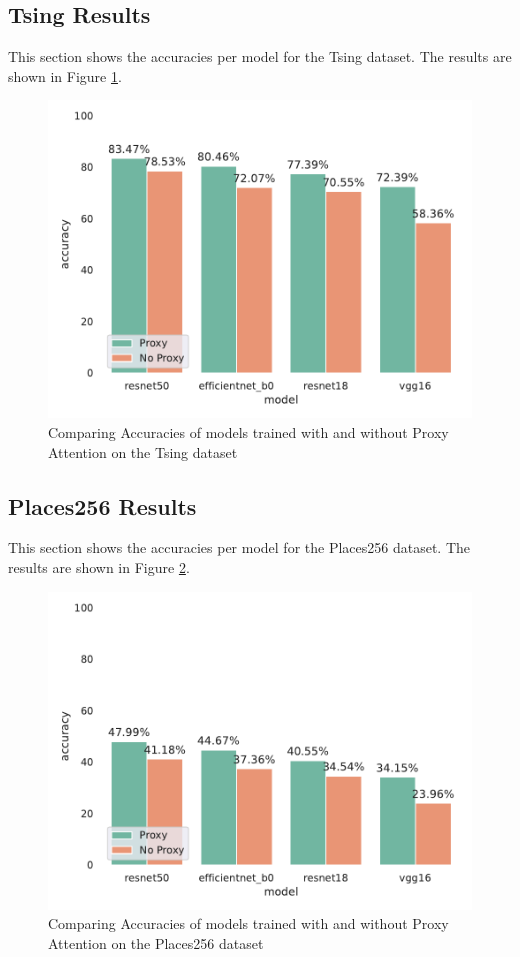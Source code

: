 \subsection{Tsing Results}
This section shows the accuracies per model for the Tsing dataset. The results are shown in Figure \ref{fig:tsing_results}. 
\begin{figure}[H]
    \centering
    \includegraphics[width=1\textwidth]{results/tsing_results.pdf}
    \caption{Comparing Accuracies of models trained with and without Proxy Attention on the Tsing dataset}
    \label{fig:tsing_results}
\end{figure}

\subsection{Places256 Results}
This section shows the accuracies per model for the Places256 dataset. The results are shown in Figure \ref{fig:places256_results}. 
\begin{figure}[H]
    \centering
    \includegraphics[width=1\textwidth]{results/places256_results.pdf}
    \caption{Comparing Accuracies of models trained with and without Proxy Attention on the Places256 dataset}
    \label{fig:places256_results}
\end{figure}

